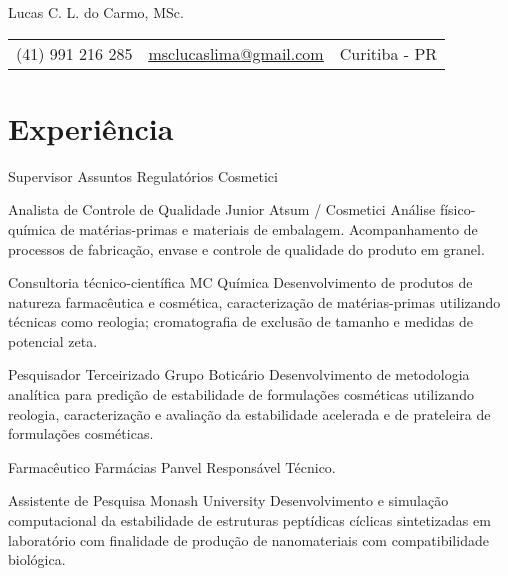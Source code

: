 \pagestyle{fancy} %
\fancyhf{} 
\renewcommand{\headrulewidth}{0pt}


\thispagestyle{empty}

\begin{center}
	
	{\LARGE Lucas C. L. do Carmo, MSc.}
	
	\vspace{6pt}
	\begin{tabular}{c|c|c}
		(41) 991 216 285 & \textcolor{Accent}{\underline{\href{mailto:msclucaslima@gmail.com}{msclucaslima@gmail.com}}} & Curitiba - PR
	\end{tabular}

	\vspace{6pt}
	
\end{center}
	

\section{Experiência}

{Supervisor Assuntos Regulatórios}
{Cosmetici}
{}

{Analista de Controle de Qualidade Junior}
{Atsum / Cosmetici}
{
	Análise físico-química de matérias-primas e materiais de embalagem.
	Acompanhamento de processos de fabricação, envase e controle de qualidade do
	produto em granel.
}

{Consultoria técnico-científica}
{MC Química}
{
	Desenvolvimento de produtos de natureza farmacêutica e cosmética, 
	caracterização de matérias-primas utilizando técnicas como reologia;
	cromatografia de exclusão de tamanho e medidas de potencial zeta.
}

{Pesquisador Terceirizado}
{Grupo Boticário}
{
	Desenvolvimento de metodologia analítica para predição de estabilidade
	de formulações cosméticas utilizando reologia,
	caracterização e avaliação da estabilidade acelerada e de prateleira
	de formulações cosméticas.
}

{Farmacêutico}
{Farmácias Panvel}
{Responsável Técnico.}

{Assistente de Pesquisa}
{Monash University}
{
	Desenvolvimento e simulação computacional da estabilidade 
	de estruturas peptídicas cíclicas sintetizadas em laboratório 
	com finalidade de produção de nanomateriais com compatibilidade biológica.
}

